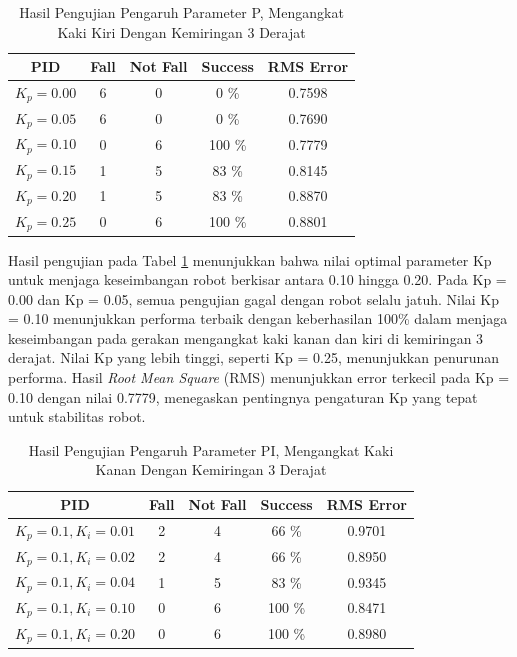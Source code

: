 \begin{enumerate}[label=\Alph*.]
        \begin{table}[h]
            \centering
            \caption{Hasil Pengujian Pengaruh Parameter P, Mengangkat Kaki Kiri Dengan Kemiringan 3 Derajat}
            \begin{tabular}{|c|c|c|c|c|}
                \hline
                \textbf{PID} & \textbf{Fall} & \textbf{Not Fall} & \textbf{Success} & RMS Error \\
                \hline
                $K_p = 0.00$ & 6 & 0 & 0   \% & 0.7598 \\
                $K_p = 0.05$ & 6 & 0 & 0   \% & 0.7690 \\
                $K_p = 0.10$ & 0 & 6 & 100 \% & 0.7779 \\
                $K_p = 0.15$ & 1 & 5 & 83  \% & 0.8145 \\
                $K_p = 0.20$ & 1 & 5 & 83  \% & 0.8870 \\
                $K_p = 0.25$ & 0 & 6 & 100 \% & 0.8801 \\            
                \hline
            \end{tabular}
            \label{tab:pengujian_p}
        \end{table}

        \hspace*{1em} Hasil pengujian pada Tabel \ref{tab:pengujian_p} menunjukkan bahwa nilai optimal parameter Kp untuk menjaga keseimbangan robot berkisar antara 0.10 hingga 0.20. Pada Kp = 0.00 dan Kp = 0.05, semua pengujian gagal dengan robot selalu jatuh. Nilai Kp = 0.10 menunjukkan performa terbaik dengan keberhasilan 100\% dalam menjaga keseimbangan pada gerakan mengangkat kaki kanan dan kiri di kemiringan 3 derajat. Nilai Kp yang lebih tinggi, seperti Kp = 0.25, menunjukkan penurunan performa. Hasil \textit{Root Mean Square} (RMS) menunjukkan error terkecil pada Kp = 0.10 dengan nilai 0.7779, menegaskan pentingnya pengaturan Kp yang tepat untuk stabilitas robot.

        \begin{table}[h]
            \centering
            \caption{Hasil Pengujian Pengaruh Parameter PI, Mengangkat Kaki Kanan Dengan Kemiringan 3 Derajat}
            \begin{tabular}{|c|c|c|c|c|}
                \hline
                \textbf{PID} & \textbf{Fall} & \textbf{Not Fall} & \textbf{Success} & RMS Error \\
                \hline
                $K_p = 0.1, K_i = 0.01$ & 2 & 4 & 66 \%  & 0.9701\\
                $K_p = 0.1, K_i = 0.02$ & 2 & 4 & 66 \%  & 0.8950\\
                $K_p = 0.1, K_i = 0.04$ & 1 & 5 & 83 \%  & 0.9345\\
                $K_p = 0.1, K_i = 0.10$ & 0 & 6 & 100 \% & 0.8471\\
                $K_p = 0.1, K_i = 0.20$ & 0 & 6 & 100 \% & 0.8980\\           
                \hline
            \end{tabular}
            \label{tab:pengujian_pi}
        \end{table}


\end{enumerate}
